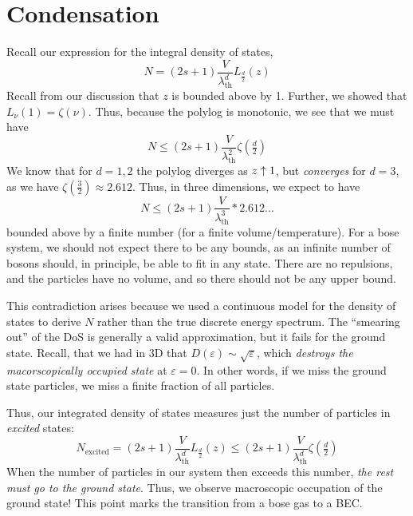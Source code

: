 \section{Condensation}
Recall our expression for the integral density of states,
\begin{equation}
	N = (2s+1)\frac{V}{\lambda^d_{\text{th}}}L_{\frac{d}{2}}(z)
\end{equation}
Recall from our discussion that \(z\) is bounded above by 1. Further, we showed that \(L_\nu(1) = \zeta(\nu)\). Thus, because the polylog is monotonic, we see that we must have
\begin{equation}
	N\leq (2s+1)\frac{V}{\lambda_{\text{th}}^2}\zeta\left(\tfrac{d}{2}\right)
\end{equation}
We know that for \(d=1,2\) the polylog diverges as \(z\uparrow 1\), but \emph{converges} for \(d=3\), as we have \(\zeta\left(\tfrac 3 2\right)\approx 2.612\). Thus, in three dimensions, we expect to have 
\[N\leq(2s+1)\frac{V}{\lambda^3_{\text{th}}}*2.612\dots\]
bounded above by a finite number (for a finite volume/temperature). For a bose system, we should not expect there to be any bounds, as an infinite number of bosons should, in principle, be able to fit in any state. There are no repulsions, and the particles have no volume, and so there should not be any upper bound.

This contradiction arises because we used a continuous model for the density of states to derive \(N\) rather than the true discrete energy spectrum. The ``smearing out'' of the DoS is generally a valid approximation, but it fails for the ground state. Recall, that we had in 3D that \(D(\varepsilon)\sim \sqrt{\varepsilon}\), which \emph{destroys the macorscopically occupied state} at \(\varepsilon = 0\). In other words, if we miss the ground state particles, we miss a finite fraction of all particles.

Thus, our integrated density of states measures just the number of particles in \emph{excited} states:
\begin{equation}
	N_{\text{excited}} = (2s+1)\frac{V}{\lambda^d_{\text{th}}}L_\frac{d}{2}(z)\leq (2s+1)\frac{V}{\lambda ^d_{\text{th}}}\zeta\left(\tfrac{d}{2}\right)
\end{equation}
When the number of particles in our system then exceeds this number, \emph{the rest must go to the ground state}. Thus, we observe macroscopic occupation of the ground state! This point marks the transition from a bose gas to a BEC.\@

